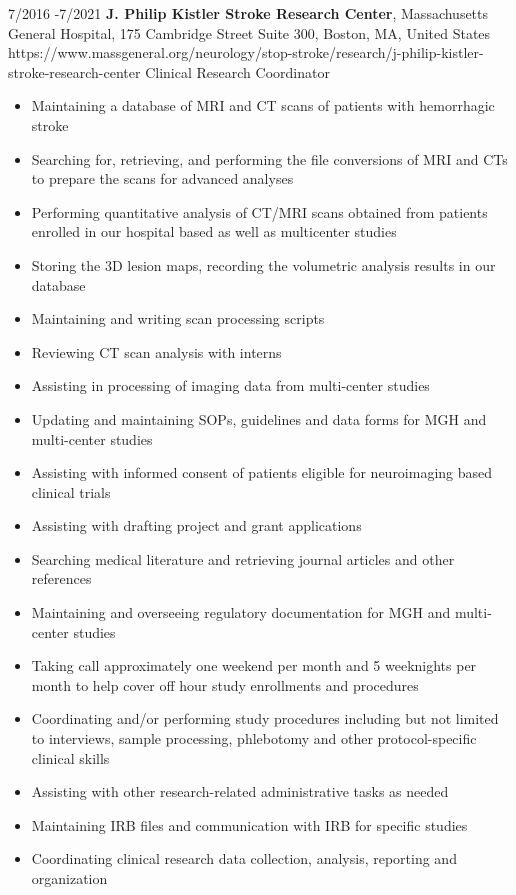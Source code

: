 \documentclass[10pt]{article} %
\begin{document}

\job
{7/2016 -}{7/2021}
{\textbf{J. Philip Kistler Stroke Research Center}, Massachusetts General Hospital, 175 Cambridge Street Suite 300, Boston, MA, United States}
{https://www.massgeneral.org/neurology/stop-stroke/research/j-philip-kistler-stroke-research-center}
{Clinical Research Coordinator}
{
\begin{itemize}
\item Maintaining a database of MRI and CT scans of patients with hemorrhagic stroke
\item Searching for, retrieving, and performing the file conversions of MRI and CTs to prepare the scans for advanced analyses
\item Performing quantitative analysis of CT/MRI scans obtained from patients enrolled in our hospital based as well as multicenter studies
\item Storing the 3D lesion maps, recording the volumetric analysis results in our database
\item Maintaining and writing scan processing scripts
\item Reviewing CT scan analysis with interns
\item Assisting in processing of imaging data from multi-center studies 
\item Updating and maintaining SOPs, guidelines and data forms for MGH and multi-center studies 
\item Assisting with informed consent of patients eligible for neuroimaging based clinical trials
\item Assisting with drafting project and grant applications
\item Searching medical literature and retrieving journal articles and other references
\item Maintaining and overseeing regulatory documentation for MGH and multi-center studies 
\item Taking call approximately one weekend per month and 5 weeknights per month to help cover off hour study enrollments and procedures
\item Coordinating and/or performing study procedures including but not limited to interviews, sample processing, phlebotomy and other protocol-specific clinical skills
\item Assisting with other research-related administrative tasks as needed
\item Maintaining IRB files and communication with IRB for specific studies
\item Coordinating clinical research data collection, analysis, reporting and organization 

\end{itemize}}
\end{document}
